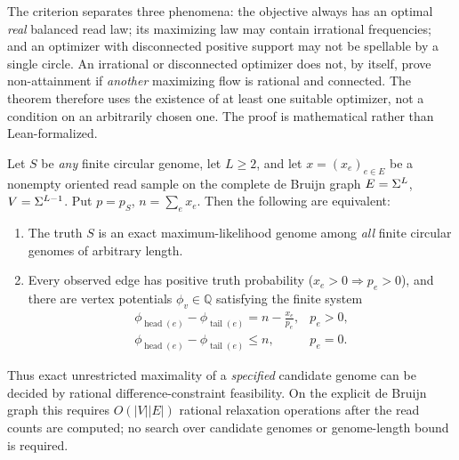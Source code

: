 The criterion separates three phenomena: the objective
always has an optimal \emph{real} balanced read law;
its maximizing law may contain irrational frequencies;
and an optimizer with disconnected positive support
may not be spellable by a single circle. An irrational
or disconnected optimizer does not, by itself, prove
non-attainment if \emph{another} maximizing flow is
rational and connected. The theorem therefore uses
the existence of at least one suitable optimizer,
not a condition on an arbitrarily chosen one.
The proof is mathematical rather than Lean-formalized.



\begin{theorem}
\label{thm:unrestricted-kkt-certificate}
Let $S$ be \emph{any} finite circular genome,
let $L\ge2$, and let $x=(x_e)_{e\in E}$
be a nonempty oriented read sample on the
complete de Bruijn graph $E=\Sigma^L$,
$V=\Sigma^{L-1}$. Put $p=p_S$,
$n=\sum_e x_e$.
Then the following are equivalent:
\begin{enumerate}
\item The truth $S$ is an exact maximum-likelihood
genome among \emph{all} finite circular genomes
of arbitrary length.
\item Every observed edge has positive truth
probability ($x_e>0\Rightarrow p_e>0$), and
there are vertex potentials $\phi_v\in\mathbb Q$
satisfying the finite system
\[
 \begin{array}{ll}
 \displaystyle
 \phi_{\operatorname{head}(e)}
       -\phi_{\operatorname{tail}(e)}
       = n-\frac{x_e}{p_e},
   &p_e>0,\\[0.8ex]
 \displaystyle
 \phi_{\operatorname{head}(e)}
       -\phi_{\operatorname{tail}(e)}\le n,
   &p_e=0.
 \end{array}
\]
\end{enumerate}
Thus exact unrestricted maximality of a \emph{specified}
candidate genome can be decided by rational
difference-constraint feasibility. On the explicit
de Bruijn graph this requires $O(|V||E|)$
rational relaxation operations after the read counts
are computed; no search over candidate genomes
or genome-length bound is required.
\end{theorem}
